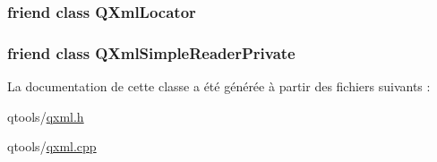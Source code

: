 \subsubsection[{Q\+Xml\+Locator}]{\setlength{\rightskip}{0pt plus 5cm}friend class {\bf Q\+Xml\+Locator}\hspace{0.3cm}{\ttfamily [friend]}}\label{class_q_xml_simple_reader_a719c6d0688866ca5c61250f04fc80ca9}
\hypertarget{class_q_xml_simple_reader_a2ff4a58652c4931df003d69975caa9f2}{}
\subsubsection[{Q\+Xml\+Simple\+Reader\+Private}]{\setlength{\rightskip}{0pt plus 5cm}friend class {\bf Q\+Xml\+Simple\+Reader\+Private}\hspace{0.3cm}{\ttfamily [friend]}}\label{class_q_xml_simple_reader_a2ff4a58652c4931df003d69975caa9f2}


La documentation de cette classe a été générée à partir des fichiers suivants \+:\begin{DoxyCompactItemize}
\item 
qtools/\hyperlink{qxml_8h}{qxml.\+h}\item 
qtools/\hyperlink{qxml_8cpp}{qxml.\+cpp}\end{DoxyCompactItemize}
